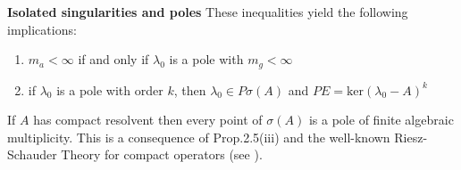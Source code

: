 \begin{example}{\textbf{Isolated singularities and poles}}
These inequalities yield the following implications:
\begin{enumerate}[-]
\item
$m_{a} < \infty$ if and only if $\lambda_{0}$ is a pole with $m_{g} < \infty$
\item
if $\lambda_{0}$ is a pole with order $k$, then $\lambda_{0} \in P\sigma(A)$ and $PE = \text{ker}(\lambda_{0} - A)^{k}$
\end{enumerate}

If $A$ has compact resolvent then every point of $\sigma(A)$ is a pole of finite algebraic multiplicity.
This is a consequence of Prop.2.5(iii) and the well-known Riesz-Schauder Theory for compact operators (see \citet[VII.4.5]{dunfordschwartz:1958}).
\end{example}

